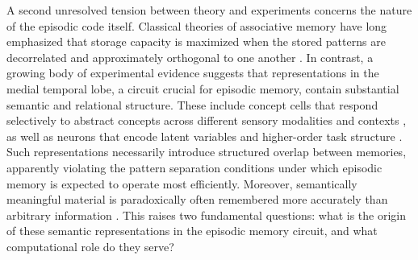 \documentclass{article}
\begin{document}
\newline\newline
A second unresolved tension between theory and experiments concerns the nature of the episodic code itself. Classical theories of associative memory have long emphasized that storage capacity is maximized when the stored patterns are decorrelated and approximately orthogonal to one another . In contrast, a growing body of experimental evidence suggests that representations in the medial temporal lobe, a circuit crucial for episodic memory, contain substantial semantic and relational structure. These include concept cells that respond selectively to abstract concepts across different sensory modalities and contexts , as well as neurons that encode latent variables and higher-order task structure . Such representations necessarily introduce structured overlap between memories, apparently violating the pattern separation conditions under which episodic memory is expected to operate most efficiently. Moreover, semantically meaningful material is paradoxically often remembered more accurately than arbitrary information . This raises two fundamental questions: what is the origin of these semantic representations in the episodic memory circuit, and what computational role do they serve?
\newline\newline
\end{document}
